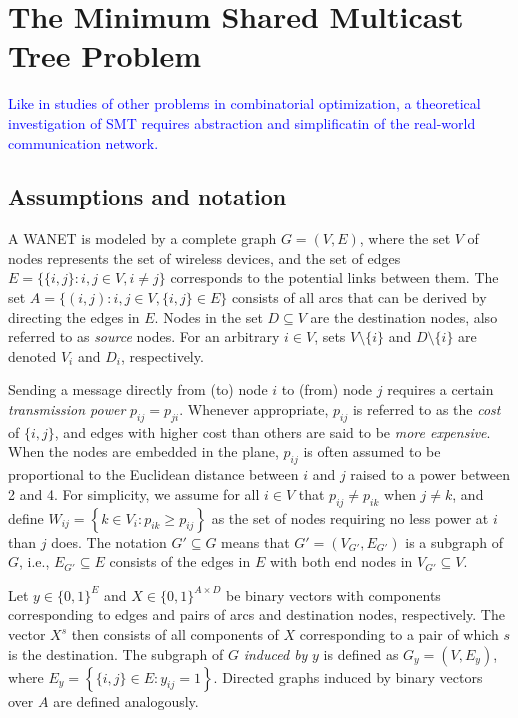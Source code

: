\section{The Minimum Shared Multicast Tree Problem}
\label{sec:SBT}
\textcolor{blue}{Like in studies of other problems in combinatorial optimization,
a theoretical investigation of SMT requires abstraction and simplificatin of the real-world communication network.}

\subsection{Assumptions and notation} \label{sec:notation}

A WANET is modeled by a complete graph $G=(V,E)$, where the set $V$ of nodes represents the set of wireless devices,
and the set of edges $E=\{\{i,j\}:i,j\in V, i\neq j\}$ corresponds to the potential links between them.
The set $A=\{(i,j):i,j\in V,\{i,j\}\in E\}$ consists of all arcs that can be derived by directing the edges in $E$.
Nodes in the set $D\subseteq V$ are the destination nodes, also referred to as \emph{source} nodes.
For an arbitrary $i\in V$, sets $V\setminus \{i\}$ and $D\setminus\{i\}$ are denoted $V_i$ and $D_i$, respectively.

Sending a message directly from (to) node $i$ to (from) node $j$ requires a certain \emph{transmission power} $p_{ij}=p_{ji}$.
Whenever appropriate, $p_{ij}$ is referred to as the \emph{cost} of $\{i,j\}$,
and edges with higher cost than others are said to be \emph{more expensive}.
When the nodes are embedded in the plane, $p_{ij}$ is often assumed \citep{Papadimitriou06SBT,Haugland12Dual,halgamuge} to be
proportional to the Euclidean distance between $i$ and $j$ raised to a power between 2 and 4.
For simplicity, we assume for all $i\in V$ that $p_{ij}\neq p_{ik}$ when $j\neq k$, and define
$W_{ij}=\left\{k\in V_i: p_{ik}\geq p_{ij}\right\}$
as the set of nodes requiring no less power at $i$ than $j$ does.
The notation $G'\subseteq G$ means that $G'=(V_{G'},E_{G'})$ is a subgraph of $G$, i.e., $E_{G'}\subseteq E$ consists of the edges in $E$ with both end nodes in $V_{G'}\subseteq V$.

Let $y \in \{0,1\}^E$ and $X\in\{0,1\}^{A\times D}$ be binary vectors with components corresponding to
edges and pairs of arcs and destination nodes, respectively.
The vector $X^s$ then consists of all components of $X$ corresponding to a pair of which $s$ is the destination.
The subgraph of $G$ \emph{induced by} $y$ is defined as $G_y=(V,E_y)$, where $E_y=\left\{\{i,j\}\in E: y_{ij}=1\right\}$.
Directed graphs induced by binary vectors over $A$ are defined analogously.

